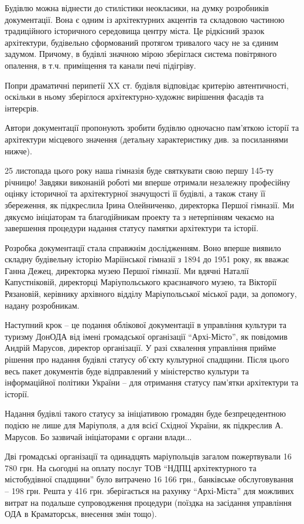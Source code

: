 Будівлю можна віднести до стилістики неокласики, на думку розробників
документації. Вона є одним із архітектурних акцентів та складовою частиною
традиційного історичного середовища центру міста. Це рідкісний зразок
архітектури, будівельно сформований протягом тривалого часу не за єдиним
задумом. Причому, в будівлі значною мірою зберіглася система повітряного
опалення, в т.ч. приміщення та канали печі підігріву.

Попри драматичні перипетії XX ст. будівля відповідає критерію автентичності,
оскільки в ньому зберіглося архітектурно-художнє вирішення фасадів та
інтерєрів.

Автори документації пропонують зробити будівлю одночасно пам'яткою історії та
архітектури місцевого значення (детальну характеристику див. за посиланнями
нижче).

25 листопада цього року наша гімназія буде святкувати свою першу 145-ту
річницю! Завдяки виконаній роботі ми вперше отримали незалежну професійну
оцінку історичної та архітектурної значущості її будівлі, а також стану її
збереження, як підкреслила Ірина Олейниченко, директорка Першої гімназії. Ми
дякуємо ініціаторам та благодійникам проекту та з нетерпінням чекаємо на
завершення процедури надання статусу памятки архітектури та історії.

Розробка документації стала справжнім дослідженням. Воно вперше виявило складну
будівельну історію Маріїнської гімназії з 1894 до 1951 року, як вважає Ганна
Дежец, директорка музею Першої гімназії. Ми вдячні Наталії Капустніковій,
директорці Маріупольського краєзнавчого музею, та Вікторії Рязановій, керівнику
архівного відділу Маріупольської міської ради, за допомогу, надану розробникам.

Наступний крок – це подання облікової документації в управління культури та
туризму ДонОДА від імені громадської організації \enquote{Архі-Місто}, як повідомив
Андрій Марусов, директор організації. У разі схвалення управління прийме
рішення про надання будівлі статусу об'єкту культурної спадщини. Після цього
весь пакет документів буде відправлений у міністерство культури та
інформаційної політики України – для отримання статусу пам'ятки архітектури та
історії. 

Надання будівлі такого статусу за ініціативою громадян буде безпрецедентною
подією не лише для Маріуполя, а для всієї Східної України, як підкреслив
А. Марусов. Бо зазвичай ініціаторами є органи влади...

Дві громадські організації та одинадцять маріупольців загалом пожертвували 16
780 грн. На сьогодні на оплату послуг ТОВ \enquote{НДПЦ архітектурного та
містобудівної спадщини} було витрачено 16 166 грн., банківське обслуговування –
198 грн.  Решта у 416 грн. зберігається на рахунку \enquote{Архі-Міста} для
можливих витрат на подальше супроводження процедури (поїздка на засідання
управління ОДА в Краматорськ, внесення змін тощо). 

